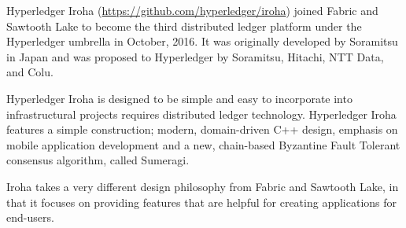 Hyperledger Iroha (\url{https://github.com/hyperledger/iroha}) joined Fabric and Sawtooth Lake to become the third distributed ledger platform under the Hyperledger umbrella in October, 2016. It was originally developed by Soramitsu in Japan and was proposed to Hyperledger by Soramitsu, Hitachi, NTT Data, and Colu.

Hyperledger Iroha is designed to be simple and easy to incorporate into infrastructural projects requires distributed ledger technology. Hyperledger Iroha features a simple construction; modern, domain-driven C++ design, emphasis on mobile application development and a new, chain-based Byzantine Fault Tolerant consensus algorithm, called Sumeragi. 

Iroha takes a very different design philosophy from Fabric and Sawtooth Lake, in that it focuses on providing features that are helpful for creating applications for end-users. 
